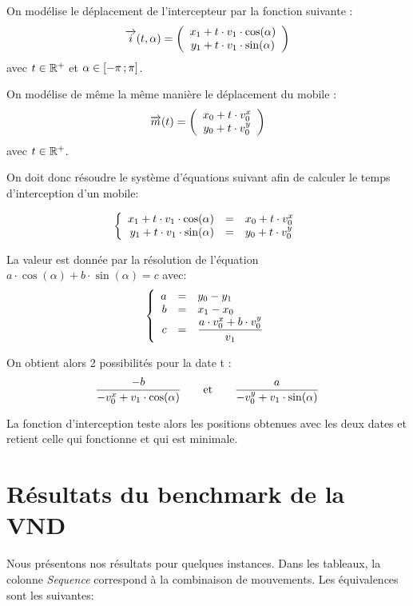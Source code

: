 	On modélise le déplacement de l'intercepteur par la fonction suivante : 
	\[
	\overrightarrow{i}(t,\alpha) = 
	\left(
	\begin{array}{c}
	 x_1 + t \cdot v_1 \cdot \cos(\alpha)\\
	 y_1 + t \cdot v_1 \cdot \sin(\alpha)
	\end{array}
	\right)
	\]
	avec $t \in \mathbb{R}^+$ et $\alpha \in \mathopen{[}-\pi\mathclose{}\mathpunct{};\pi\mathclose{]}$.

	On modélise de même la même manière le déplacement du mobile :
	\[
	\overrightarrow{m}(t) = 
	\left(
	\begin{array}{c}
	 x_0 + t \cdot v^{x}_0\\
	 y_0 + t \cdot v^{y}_0
	\end{array}
	\right)
	\]
	avec $t \in \mathbb{R}^+$.

	On doit donc résoudre le système d'équations suivant afin de calculer le temps d'interception d'un mobile:

	\[
	\left\{
	\begin{array}{r c l}
	x_1 + t \cdot v_1 \cdot \cos(\alpha) &=& x_0 + t \cdot v^{x}_0\\
	y_1 + t \cdot v_1 \cdot \sin(\alpha) &=& y_0 + t \cdot v^{y}_0
	\end{array}
	\right.
	\]

	La valeur est donnée par la résolution de l'équation $a \cdot \cos(\alpha)+b \cdot \sin(\alpha) = c$ avec:
	\[
	\left\{
	\begin{array}{r c l}
	a &=& y_0 - y_1\\
	b &=& x_1 - x_0\\
	c &=& \displaystyle \frac{a \cdot v^{x}_0 +b \cdot v^{y}_0}{v_1}
	\end{array}
	\right.
	\]

	On obtient alors 2 possibilités pour la date t : 
	\[ \frac{-b}{-v^{x}_0 + v_1 \cdot \cos(\alpha)}  \qquad\text{et}\qquad \frac{a}{-v^{y}_0 + v_1 \cdot \sin(\alpha)} \]

	La fonction d'interception teste alors les positions obtenues avec les deux dates et retient celle qui fonctionne et qui est minimale.
	
\chapter{Résultats du benchmark de la VND}
\label{ann:benchmark-vnd}
	Nous présentons nos résultats pour quelques instances. Dans les tableaux, la colonne \emph{Sequence} correspond à la combinaison de mouvements. Les équivalences sont les suivantes:

